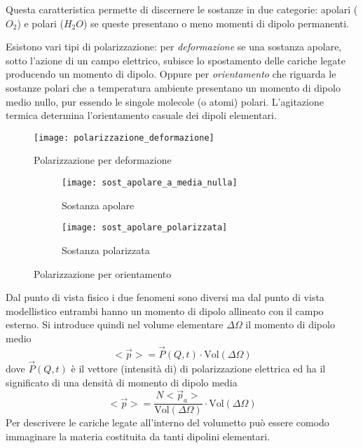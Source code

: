 Questa caratteristica permette di discernere le sostanze in due categorie: apolari ($O_2$) e polari
($H_2O$) se queste presentano o meno momenti di dipolo permanenti.

Esistono vari tipi di polarizzazione: per \textit{deformazione} se una sostanza apolare, sotto 
l'azione di un campo elettrico, subisce lo spostamento delle cariche legate producendo 
un momento di dipolo.
Oppure per \textit{orientamento} che riguarda le sostanze polari che a temperatura ambiente
presentano un momento di dipolo medio nullo, pur essendo le singole molecole (o atomi) polari.
L'agitazione termica determina l'orientamento casuale dei dipoli elementari.

\begin{figure}[h!]
 \centering
 \texttt{[image: polarizzazione\_deformazione]}
 \caption{Polarizzazione per deformazione}
\end{figure}


\begin{figure}[h!]
 \begin{subfigure}{.5\textwidth}
 \centering
 \texttt{[image: sost\_apolare\_a\_media\_nulla]}
 \caption{Sostanza apolare}
 \end{subfigure} 
 \begin{subfigure}{.5\textwidth}
\centering
 \texttt{[image: sost\_apolare\_polarizzata]}
 \caption{Sostanza polarizzata}
 \end{subfigure}
 \caption{Polarizzazione per orientamento}
\end{figure}

Dal punto di vista fisico i due fenomeni sono diversi ma dal punto di vista modellistico
entrambi hanno un momento di dipolo allineato con il campo esterno.
Si introduce quindi nel volume elementare $\Delta\Omega$ il momento di dipolo medio
$$
<\vec{p}> = \vec{P}(Q,t)\cdot \text{Vol}(\Delta\Omega)
$$
dove $\vec{P}(Q,t)$ è il vettore (intensità di) di polarizzazione elettrica ed ha il significato 
di una densità di momento di dipolo media
$$
<\vec{p}> = \frac{N<\vec{p}_a>}{\text{Vol}(\Delta\Omega)}\cdot \text{Vol}(\Delta\Omega)
$$
Per descrivere le cariche legate all'interno del volumetto può essere comodo immaginare la materia
costituita da tanti dipolini elementari.
